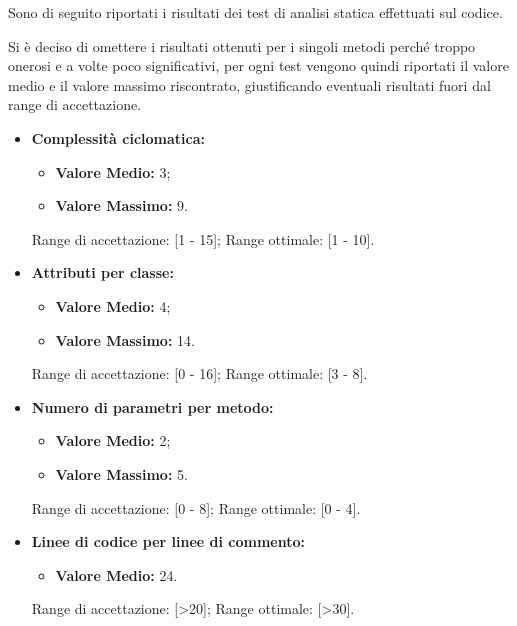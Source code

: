 Sono di seguito riportati i risultati dei test di analisi statica effettuati sul codice.

\noindent Si è deciso di omettere i risultati ottenuti per i singoli metodi perché troppo onerosi e a volte poco significativi, per ogni test vengono quindi riportati il valore medio e il valore massimo riscontrato, giustificando eventuali risultati fuori dal range di accettazione.

\begin{itemize}

	\item \textbf{Complessità ciclomatica:}
	\begin{itemize}
		\item \textbf{Valore Medio:} 3;
		\item \textbf{Valore Massimo:} 9.
	\end{itemize}

Range di accettazione: [1 - 15];\newline
Range ottimale: [1 - 10].


	\item \textbf{Attributi per classe:}
	\begin{itemize}
		\item \textbf{Valore Medio:} 4;
		\item \textbf{Valore Massimo:} 14.
	\end{itemize}

Range di accettazione: [0 - 16];\newline
Range ottimale: [3 - 8].


	\item \textbf{Numero di parametri per metodo:}
	\begin{itemize}
		\item \textbf{Valore Medio:} 2;
		\item \textbf{Valore Massimo:} 5.
	\end{itemize}

Range di accettazione: [0 - 8];\newline
Range ottimale: [0 - 4].


	\item \textbf{Linee di codice per linee di commento:}
	\begin{itemize}
		\item \textbf{Valore Medio:} 24.
	\end{itemize}

Range di accettazione: [>20];\newline
Range ottimale: [>30].



\end{itemize}
